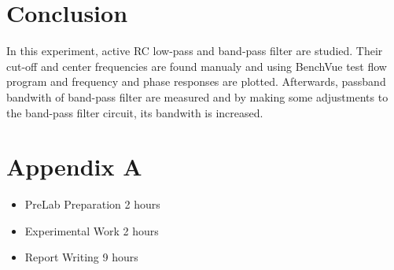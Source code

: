 \documentclass[letterpaper,12pt]{article}
\begin{document}
\section{Conclusion}
In this experiment, active RC low-pass and band-pass filter are studied. Their cut-off and center frequencies are found manualy and using BenchVue test flow program and frequency and phase responses are plotted. Afterwards, passband bandwith of band-pass filter are measured and by making some adjustments to the band-pass filter circuit, its bandwith is increased.

\section*{Appendix A}
\begin{itemize}
    \item PreLab Preparation 2 hours
    \item Experimental Work 2  hours
    \item Report Writing 9 hours
\end{itemize}
\end{document}

